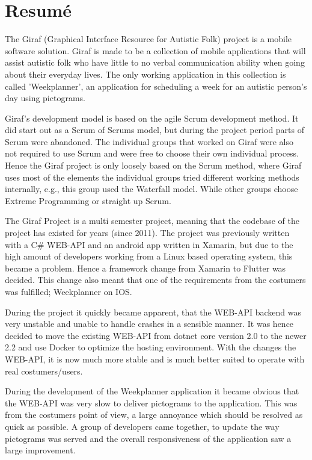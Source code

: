 \chapter*{Resumé}
The Giraf (Graphical Interface Resource for Autistic Folk) project is a mobile software solution.
Giraf is made to be a collection of mobile applications that will assist autistic folk who have little to no verbal communication ability when going about their everyday lives.
The only working application in this collection is called 'Weekplanner', an application for scheduling a week for an autistic person's day using pictograms.

Giraf's development model is based on the agile Scrum development method.
It did start out as a Scrum of Scrums model, but during the project period parts of Scrum were abandoned.
The individual groups that worked on Giraf were also not required to use Scrum and were free to choose their own individual process.
Hence the Giraf project is only loosely based on the Scrum method, where Giraf uses most of the elements the individual groups tried different working methods internally, e.g., this group used the Waterfall model.
While other groups choose Extreme Programming or straight up Scrum. 

The Giraf Project is a multi semester project, meaning that the codebase of the project has existed for years (since 2011). 
The project was previously written with a C\# WEB-API and an android app written in Xamarin, but due to the high amount of developers working from a Linux based operating system, this became a problem. 
Hence a framework change from Xamarin to Flutter was decided. 
This change also meant that one of the requirements from the costumers was fulfilled; Weekplanner on IOS.

During the project it quickly became apparent, that the WEB-API backend was very unstable and unable to handle crashes in a sensible manner. 
It was hence decided to move the existing WEB-API from dotnet core version 2.0 to the newer 2.2 and use Docker to optimize the hosting environment. 
With the changes the WEB-API, it is now much more stable and is much better suited to operate with real costumers/users.

During the development of the Weekplanner application it became obvious that the WEB-API was very slow to deliver pictograms to the application. 
This was from the costumers point of view, a large annoyance which should be resolved as quick as possible. 
A group of developers came together, to update the way pictograms was served and the overall responsiveness of the application saw a large improvement.

